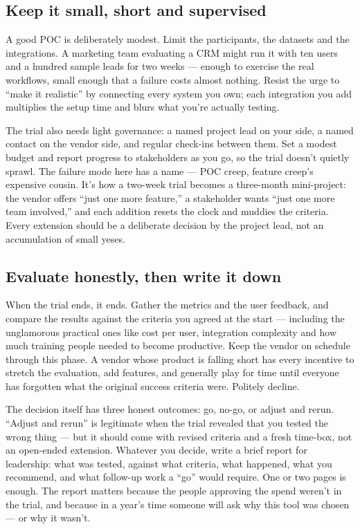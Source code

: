 \subsection{Keep it small, short and supervised}


A good POC is deliberately modest. Limit the participants, the datasets and the integrations. A marketing team evaluating a CRM might run it with ten users and a hundred sample leads for two weeks — enough to exercise the real workflows, small enough that a failure costs almost nothing. Resist the urge to ``make it realistic'' by connecting every system you own; each integration you add multiplies the setup time and blurs what you're actually testing.


The trial also needs light governance: a named project lead on your side, a named contact on the vendor side, and regular check-ins between them. Set a modest budget and report progress to stakeholders as you go, so the trial doesn't quietly sprawl. The failure mode here has a name — POC creep, feature creep's expensive cousin. It's how a two-week trial becomes a three-month mini-project: the vendor offers ``just one more feature,'' a stakeholder wants ``just one more team involved,'' and each addition resets the clock and muddies the criteria. Every extension should be a deliberate decision by the project lead, not an accumulation of small yeses.



\subsection{Evaluate honestly, then write it down}


When the trial ends, it ends. Gather the metrics and the user feedback, and compare the results against the criteria you agreed at the start — including the unglamorous practical ones like cost per user, integration complexity and how much training people needed to become productive. Keep the vendor on schedule through this phase. A vendor whose product is falling short has every incentive to stretch the evaluation, add features, and generally play for time until everyone has forgotten what the original success criteria were. Politely decline.


The decision itself has three honest outcomes: go, no-go, or adjust and rerun. ``Adjust and rerun'' is legitimate when the trial revealed that you tested the wrong thing — but it should come with revised criteria and a fresh time-box, not an open-ended extension. Whatever you decide, write a brief report for leadership: what was tested, against what criteria, what happened, what you recommend, and what follow-up work a ``go'' would require. One or two pages is enough. The report matters because the people approving the spend weren't in the trial, and because in a year's time someone will ask why this tool was chosen — or why it wasn't.



